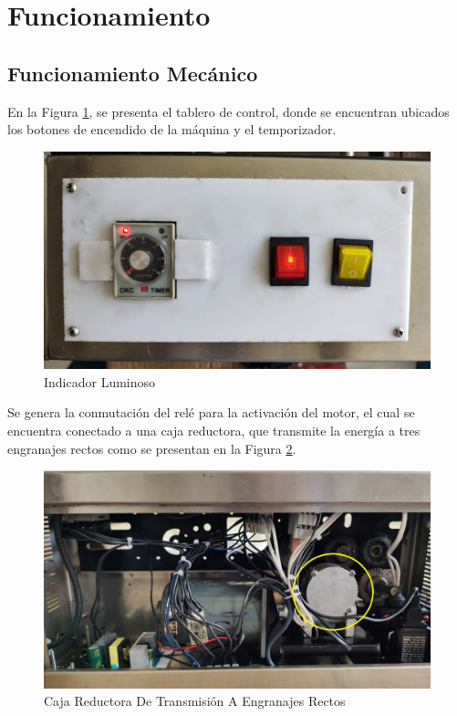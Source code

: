 \newpage	
\section{Funcionamiento}

\subsection{Funcionamiento Mecánico}
En la Figura \ref{fig:indicador}, se presenta el tablero de control, donde se encuentran ubicados los botones de encendido de la máquina y el temporizador.

\begin{figure}[ht]
	\centering
	\includegraphics[angle=270, scale=0.25]{Figs/200.jpg}
	\caption{Indicador Luminoso}
	\label{fig:indicador}
\end{figure}

Se genera la conmutación del relé para la activación del motor, el cual se encuentra conectado a una caja reductora, que transmite la energía a tres engranajes rectos como se presentan en la Figura \ref{fig:caja}.

\begin{figure}[ht]
	\centering
	\includegraphics[scale=0.25]{Figs/201.jpg}
	\caption{Caja Reductora De Transmisión A Engranajes Rectos}
	\label{fig:caja}
\end{figure}

